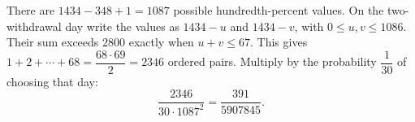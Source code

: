 There are $1434-348+1=1087$ possible hundredth-percent values. On the two-withdrawal day write the values as $1434-u$ and $1434-v$, with $0\le u,v\le1086$. Their sum exceeds $2800$ exactly when $u+v\le67$. This gives $1+2+\cdots+68=\dfrac{68\cdot69}{2}=2346$ ordered pairs. Multiply by the probability $\dfrac{1}{30}$ of choosing that day:
\[\boxed{\dfrac{2346}{30\cdot1087^2}=\dfrac{391}{5907845}}.\]
